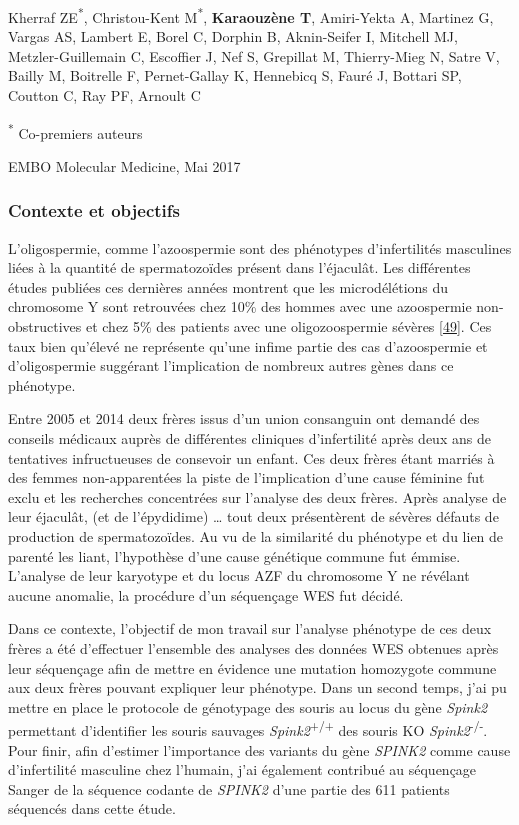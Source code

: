 \documentclass[12pt,twoside]{reedthesis}
\theoremstyle{definition}
\theoremstyle{definition}
\theoremstyle{remark}
\begin{document}
  Kherraf ZE\textsuperscript{*}, Christou-Kent M\textsuperscript{*},
  \textbf{Karaouzène T}, Amiri-Yekta A, Martinez G, Vargas AS, Lambert E,
  Borel C, Dorphin B, Aknin-Seifer I, Mitchell MJ, Metzler-Guillemain C,
  Escoffier J, Nef S, Grepillat M, Thierry-Mieg N, Satre V, Bailly M,
  Boitrelle F, Pernet-Gallay K, Hennebicq S, Fauré J, Bottari SP, Coutton
  C, Ray PF, Arnoult C
  
  \textsuperscript{*} Co-premiers auteurs
  
  EMBO Molecular Medicine, Mai 2017
  
  \newpage
  
  \subsubsection{Contexte et objectifs}\label{contexte-et-objectifs}
  
  L'oligospermie, comme l'azoospermie sont des phénotypes d'infertilités
  masculines liées à la quantité de spermatozoïdes présent dans
  l'éjaculât. Les différentes études publiées ces dernières années
  montrent que les microdélétions du chromosome Y sont retrouvées chez
  10\% des hommes avec une azoospermie non-obstructives et chez 5\% des
  patients avec une oligozoospermie sévères
  {[}\protect\hyperlink{ref-Hotaling2014}{49}{]}. Ces taux bien qu'élevé
  ne représente qu'une infime partie des cas d'azoospermie et
  d'oligospermie suggérant l'implication de nombreux autres gènes dans ce
  phénotype.
  
  Entre 2005 et 2014 deux frères issus d'un union consanguin ont demandé
  des conseils médicaux auprès de différentes cliniques d'infertilité
  après deux ans de tentatives infructueuses de consevoir un enfant. Ces
  deux frères étant marriés à des femmes non-apparentées la piste de
  l'implication d'une cause féminine fut exclu et les recherches
  concentrées sur l'analyse des deux frères. Après analyse de leur
  éjaculât, (et de l'épydidime) \ldots{} tout deux présentèrent de sévères
  défauts de production de spermatozoïdes. Au vu de la similarité du
  phénotype et du lien de parenté les liant, l'hypothèse d'une cause
  génétique commune fut émmise. L'analyse de leur karyotype et du locus
  AZF du chromosome Y ne révélant aucune anomalie, la procédure d'un
  séquençage WES fut décidé.
  
  Dans ce contexte, l'objectif de mon travail sur l'analyse phénotype de
  ces deux frères a été d'effectuer l'ensemble des analyses des données
  WES obtenues après leur séquençage afin de mettre en évidence une
  mutation homozygote commune aux deux frères pouvant expliquer leur
  phénotype. Dans un second temps, j'ai pu mettre en place le protocole de
  génotypage des souris au locus du gène \emph{Spink2} permettant
  d'identifier les souris sauvages \emph{Spink2}\textsuperscript{+/+} des
  souris KO \emph{Spink2}\textsuperscript{-/-}. Pour finir, afin d'estimer
  l'importance des variants du gène \emph{SPINK2} comme cause
  d'infertilité masculine chez l'humain, j'ai également contribué au
  séquençage Sanger de la séquence codante de \emph{SPINK2} d'une partie
  des 611 patients séquencés dans cette étude.
  
\end{document}
